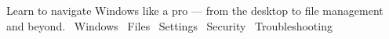 
  {Learn to navigate Windows like a pro --- from the desktop to file management and beyond.}
  {\faWindows\ Windows \quad \faFolder\ Files \quad \faCog\ Settings \quad \faLock\ Security \quad \faTools\ Troubleshooting}
